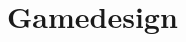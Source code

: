 
\section{Gamedesign}\label{sec:differenzierung}

\renewcommand{\kapitelautor}{Autor: Irgendwer} %

%
%







\renewcommand{\kapitelautor}{}
